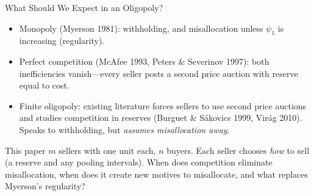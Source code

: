 \documentclass[11pt,aspectratio=169]{beamer}
\def\meditem{\smallskip\item}
\begin{document}
\begin{frame}{What Should We Expect in an Oligopoly?}
\begin{itemize}
\item \alert{Monopoly} (Myerson 1981): withholding, and misallocation unless $\psi_1$ is increasing (regularity).
\meditem \alert{Perfect competition} (McAfee 1993, Peters \& Severinov 1997): both inefficiencies vanish---every seller posts a second price auction with reserve equal to cost.
\meditem \alert{Finite oligopoly}: existing literature forces sellers to use second price auctions and studies competition in reserves (Burguet \& S\'akovics 1999, Vir\'ag 2010). Speaks to withholding, but \emph{assumes misallocation away}.
\end{itemize}

\medskip{}
\begin{block}{This paper}
$m$ sellers with one unit each, $n$ buyers. Each seller chooses \emph{how} to sell (a reserve and any pooling intervals). When does competition eliminate misallocation, when does it create new motives to misallocate, and what replaces Myerson's regularity?
\end{block}
\end{frame}
\end{document}
